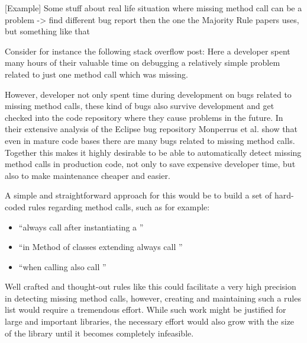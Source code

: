 [Example]
Some stuff about real life situation where missing method call can be a problem
-> find different bug report then the one the Majority Rule papers uses, but something like that

Consider for instance the following stack overflow post:
Here a developer spent many hours of their valuable time on debugging a relatively simple problem related to just one method call which was missing.

However, developer not only spent time during development on bugs related to missing method calls, these kind of bugs also survive development and get checked into the code repository where they cause problems in the future.
In their extensive analysis of the Eclipse bug repository Monperrus et al. \cite{monperrus2013detecting} show that even in mature code bases there are many bugs related to missing method calls.
Together this makes it highly desirable to be able to automatically detect missing method calls in production code, not only to save expensive developer time, but also to make maintenance cheaper and easier.

A simple and straightforward approach for this would be to build a set of hard-coded rules regarding method calls, such as for example:
\begin{itemize}
    \item ``always call  after instantiating a ''
    \item ``in Method  of classes extending  always call ''
    \item ``when calling  also call ''
\end{itemize}
Well crafted and thought-out rules like this could facilitate a very high precision in detecting missing method calls, however, creating and maintaining such a rules list would require a tremendous effort.
While such work might be justified for large and important libraries, the necessary effort would also grow with the size of the library until it becomes completely infeasible.

